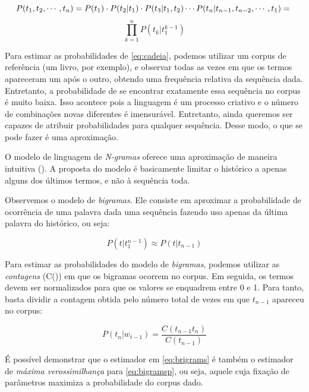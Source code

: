 \begin{equation}
\label{eq:cadeia}
	P(t_1, t_2, \cdots, t_n) = P(t_1)\cdot P(t_2|t_1)\cdot P(t_3|t_1, t_2) \cdots P(t_n|t_{n-1},t_{n-2}, \cdots, t_1) =\notag\\ 
\end{equation}
\begin{equation}
	\prod_{k=1}^{n} P(t_{k}|t_{1}^{k-1})
\end{equation}

Para estimar as probabilidades de \ref{eq:cadeia}, podemos utilizar um corpus de referência (um livro, por exemplo), e observar todas as vezes em que os termos apareceram um após o outro, obtendo uma frequência relativa da sequência dada. Entretanto, a probabilidade de se encontrar exatamente essa sequência no corpus é muito baixa. Isso acontece pois a linguagem é um processo criativo e o número de combinações novas diferentes é imensurável. Entretanto, ainda queremos ser capazes de atribuir probabilidades para qualquer sequência. Desse modo, o que se pode fazer é uma aproximação.

O modelo de linguagem de \textit{N-gramas} oferece uma aproximação de maneira intuitiva (\cite{Jurafsky:2009:SLP:1214993}). A proposta do modelo é basicamente limitar o histórico a apenas alguns dos últimos termos, e não à sequência toda. 

Observemos o modelo de \textit{bigramas}. Ele consiste em aproximar a probabilidade de ocorrência de uma palavra dada uma sequência
fazendo uso apenas da última palavra do histórico, ou seja:

\begin{equation}
\label{eq:bigramsp}
    P(t|t_{1}^{n-1}) \approx P(t|t_{n-1})
\end{equation}

Para estimar as probabilidades do modelo de \textit{bigramas}, podemos utilizar as \textit{contagens} (C()) em que os bigramas ocorrem no corpus. Em seguida, os termos devem ser normalizados para que os valores se enquadrem entre 0 e 1. Para tanto, basta dividir a contagem obtida pelo número total de vezes em que $t_{n-1}$ apareceu no corpus:

\begin{equation}
\label{eq:brigrams}
    P(t_n|w_{t-1}) = \frac{C(t_{n-1}t_n)}{C(t_{n-1})}
\end{equation}


É possível demonstrar que o estimador em \ref{eq:brigrams} é também o estimador de \textit{máxima verossimilhança} para \ref{eq:bigramsp}, ou seja, aquele cuja fixação de parâmetros maximiza a probabilidade do corpus dado.

